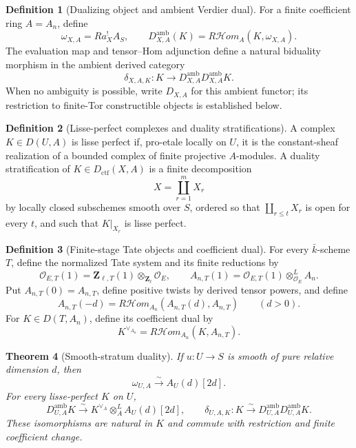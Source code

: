 \documentclass[10pt]{article}
\newtheorem{theorem}{Theorem}[section]
\theoremstyle{definition}
\newtheorem{definition}[theorem]{Definition}
\begin{document}
\begin{definition}[Dualizing object and ambient Verdier dual]
For a finite coefficient ring \(A=A_n\), define
\[
 \omega_{X,A}=Ra_X^!A_S,
 \qquad
 D_{X,A}^{\mathrm{amb}}(K)=R\mathcal Hom_A(K,\omega_{X,A}).
\]
The evaluation map and tensor--Hom adjunction define a natural biduality
morphism in the ambient derived category
\[
\delta_{X,A,K}:K\longrightarrow
 D_{X,A}^{\mathrm{amb}}D_{X,A}^{\mathrm{amb}}K.
\]
When no ambiguity is possible, write \(D_{X,A}\) for this ambient functor;
its restriction to finite-Tor constructible objects is established below.
\end{definition}

\begin{definition}[Lisse-perfect complexes and duality stratifications]
A complex \(K\in D(U,A)\) is lisse perfect if, pro-etale locally on \(U\),
it is the constant-sheaf realization of a bounded complex of finite
projective \(A\)-modules.  A duality stratification of
\(K\in D_{\mathrm{ctf}}(X,A)\) is a finite decomposition
\[
 X=\coprod_{r=1}^mX_r
\]
by locally closed subschemes smooth over \(S\), ordered so that
\(\coprod_{r\le t}X_r\) is open for every \(t\), and such that
\(K|_{X_r}\) is lisse perfect.
\end{definition}

\begin{definition}[Finite-stage Tate objects and coefficient dual]
For every \(\bar k\)-scheme \(T\), define the normalized Tate system and
its finite reductions by
\[
 \mathcal O_{E,T}(1)
   =\mathbf Z_{\ell,T}(1)\otimes_{\mathbf Z_\ell}\mathcal O_E,
 \qquad
 A_{n,T}(1)=\mathcal O_{E,T}(1)\otimes_{\mathcal O_E}^LA_n.
\]
Put \(A_{n,T}(0)=A_{n,T}\), define positive twists by derived tensor
powers, and define
\[
 A_{n,T}(-d)=R\mathcal Hom_{A_n}(A_{n,T}(d),A_{n,T})
 \qquad(d>0).
\]
For \(K\in D(T,A_n)\), define its coefficient dual by
\[
                         K^{\vee_{A_n}}
 =R\mathcal Hom_{A_n}(K,A_{n,T}).
\]
\end{definition}

\begin{theorem}[Smooth-stratum duality]
If \(u:U\to S\) is smooth of pure relative dimension \(d\), then
\[
 \omega_{U,A}\xrightarrow{\sim}A_U(d)[2d].
\]
For every lisse-perfect \(K\) on \(U\),
\[
 D_{U,A}^{\mathrm{amb}}K\xrightarrow{\sim}
 K^{\vee_A}\otimes_A^L A_U(d)[2d],
 \qquad
 \delta_{U,A,K}:K\xrightarrow{\sim}D_{U,A}^{\mathrm{amb}}
 D_{U,A}^{\mathrm{amb}}K.
\]
These isomorphisms are natural in \(K\) and commute with restriction and
finite coefficient change.
\end{theorem}
\end{document}

